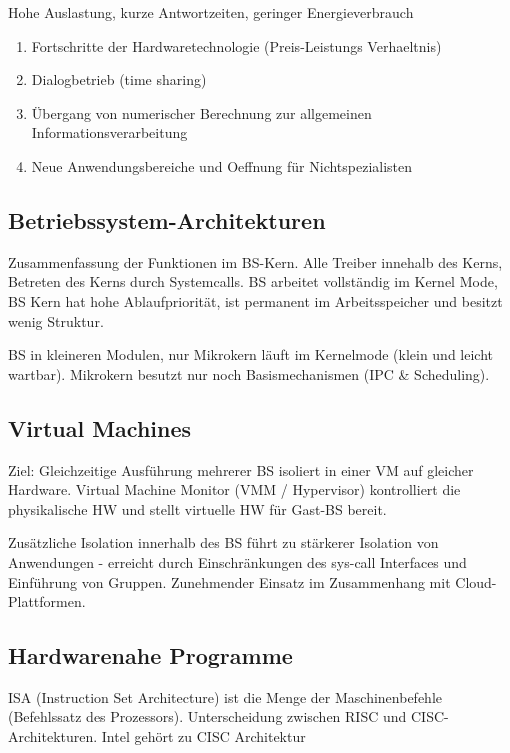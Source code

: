 Hohe Auslastung, kurze Antwortzeiten, geringer Energieverbrauch 

\begin{enumerate}
	\setlength\itemsep{0em}
	\item Fortschritte der Hardwaretechnologie (Preis-Leistungs Verhaeltnis)
	\item Dialogbetrieb (time sharing)
	\item Übergang von numerischer Berechnung zur allgemeinen Informationsverarbeitung
	\item Neue Anwendungsbereiche und Oeffnung für Nichtspezialisten 
\end{enumerate}

\subsection{Betriebssystem-Architekturen}
Zusammenfassung der Funktionen im BS-Kern. Alle Treiber innehalb des Kerns, Betreten des Kerns durch Systemcalls. BS arbeitet vollständig im Kernel Mode, BS Kern hat hohe Ablaufpriorität, ist permanent im Arbeitsspeicher und besitzt wenig Struktur. 

BS in kleineren Modulen, nur Mikrokern läuft im Kernelmode (klein und leicht wartbar). Mikrokern besutzt nur noch Basismechanismen (IPC \& Scheduling). 

\subsection{Virtual Machines}
Ziel: Gleichzeitige Ausführung mehrerer BS isoliert in einer VM auf gleicher Hardware. Virtual Machine Monitor (VMM / Hypervisor) kontrolliert die physikalische HW und stellt virtuelle HW für Gast-BS bereit. 

Zusätzliche Isolation innerhalb des BS führt zu stärkerer Isolation von Anwendungen - erreicht durch Einschränkungen des sys-call Interfaces und Einführung von Gruppen. Zunehmender Einsatz im Zusammenhang mit Cloud-Plattformen. 

\subsection{Hardwarenahe Programme}
ISA (Instruction Set Architecture) ist die Menge der Maschinenbefehle (Befehlssatz des Prozessors). Unterscheidung zwischen RISC und CISC-Architekturen. Intel gehört zu CISC Architektur

